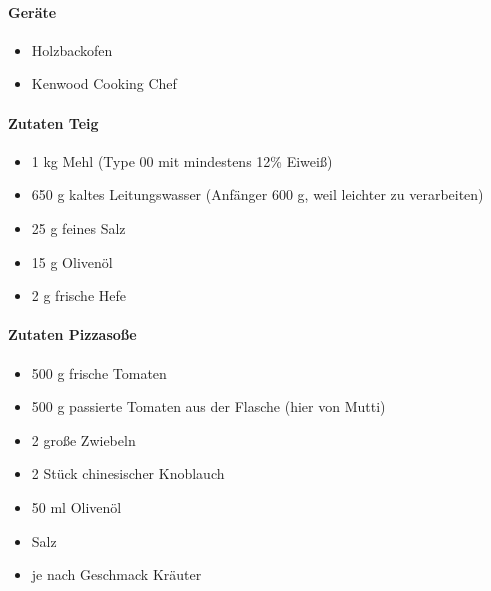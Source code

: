 \paragraph{Geräte}

\begin{itemize}[noitemsep]
	\item Holzbackofen
	\item Kenwood Cooking Chef
\end{itemize}

\paragraph{Zutaten Teig}

\begin{itemize}[noitemsep]
	\item 1 kg Mehl (Type 00 mit mindestens 12\% Eiweiß)
	\item 650 g kaltes Leitungswasser (Anfänger 600 g, weil leichter zu 
	verarbeiten)
	\item 25 g feines Salz
	\item 15 g Olivenöl
	\item 2 g frische Hefe
\end{itemize} 

\paragraph{Zutaten Pizzasoße}
 
\begin{itemize}[noitemsep]
	\item 500 g frische Tomaten
	\item 500 g passierte Tomaten aus der Flasche (hier von Mutti)
	\item 2 große Zwiebeln
	\item 2 Stück chinesischer Knoblauch
	\item 50 ml Olivenöl
	\item Salz
	\item je nach Geschmack Kräuter
\end{itemize}

